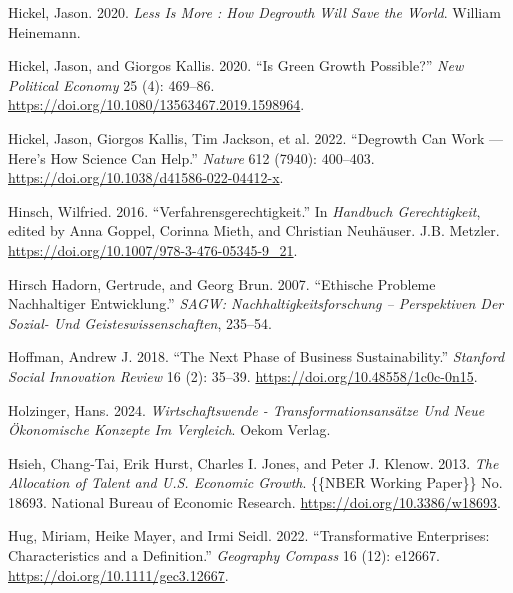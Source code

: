 \documentclass[
  a4paper,
  DIV=11,
  numbers=noendperiod,
  oneside,
  openany]{scrreprt}
\newlength{\cslhangindent}
\newenvironment{CSLReferences}[2] %
 {\begin{list}{}{%
  \setlength{\itemindent}{0pt}
  \setlength{\leftmargin}{0pt}
  \setlength{\parsep}{0pt}
  \ifodd #1
   \setlength{\leftmargin}{\cslhangindent}
   \setlength{\itemindent}{-1\cslhangindent}
  \fi
  \setlength{\itemsep}{#2\baselineskip}}}
 {\end{list}}
\begin{document}
\begin{CSLReferences}{1}{1}
Hickel, Jason. 2020. \emph{Less Is More : How Degrowth Will Save the
World}. William Heinemann.

Hickel, Jason, and Giorgos Kallis. 2020. {``Is {Green Growth
Possible}?''} \emph{New Political Economy} 25 (4): 469--86.
\url{https://doi.org/10.1080/13563467.2019.1598964}.

Hickel, Jason, Giorgos Kallis, Tim Jackson, et al. 2022. {``Degrowth Can
Work --- Here's How Science Can Help.''} \emph{Nature} 612 (7940):
400--403. \url{https://doi.org/10.1038/d41586-022-04412-x}.

Hinsch, Wilfried. 2016. {``{Verfahrensgerechtigkeit}.''} In
\emph{{Handbuch Gerechtigkeit}}, edited by Anna Goppel, Corinna Mieth,
and Christian Neuhäuser. J.B. Metzler.
\url{https://doi.org/10.1007/978-3-476-05345-9_21}.

Hirsch Hadorn, Gertrude, and Georg Brun. 2007. {``Ethische {Probleme}
Nachhaltiger {Entwicklung}.''} \emph{SAGW: Nachhaltigkeitsforschung --
Perspektiven Der Sozial- Und Geisteswissenschaften}, 235--54.

Hoffman, Andrew J. 2018. {``The {Next Phase} of {Business
Sustainability}.''} \emph{Stanford Social Innovation Review} 16 (2):
35--39. \url{https://doi.org/10.48558/1c0c-0n15}.

Holzinger, Hans. 2024. \emph{Wirtschaftswende -
{Transformationsans{ä}tze} Und Neue {Ö}konomische {Konzepte} Im
{Vergleich}}. Oekom Verlag.

Hsieh, Chang-Tai, Erik Hurst, Charles I. Jones, and Peter J. Klenow.
2013. \emph{The {Allocation} of {Talent} and {U}.{S}. {Economic
Growth}}. \{\{NBER Working Paper\}\} No. 18693. National Bureau of
Economic Research. \url{https://doi.org/10.3386/w18693}.

Hug, Miriam, Heike Mayer, and Irmi Seidl. 2022. {``Transformative
Enterprises: {Characteristics} and a Definition.''} \emph{Geography
Compass} 16 (12): e12667. \url{https://doi.org/10.1111/gec3.12667}.


\end{CSLReferences}
\end{document}
